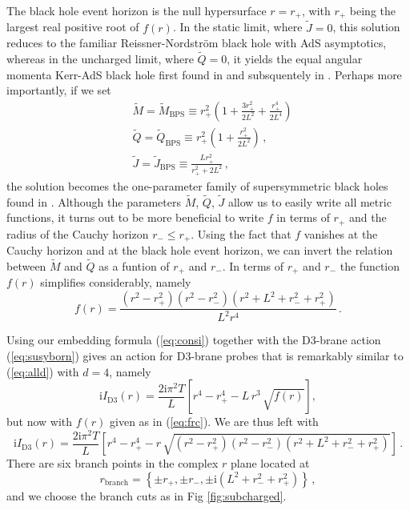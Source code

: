 \documentclass[11pt]{article}
\renewcommand{\i}{\mathrm{i}}
\begin{document}
The black hole event horizon is the null hypersurface $r=r_+$, with $r_+$ being the largest real positive root of $f(r)$. 
In the static limit, where $\tilde{J}=0$, this solution reduces to the familiar Reissner-Nordstr\"om black hole with AdS asymptotics, whereas in the uncharged limit, where $\tilde{Q}=0$, it yields the equal angular momenta Kerr-AdS black hole first found in \cite{Hawking:1998kw} and subsquentely in \cite{Gibbons:2004uw}. 
Perhaps more importantly, if we set
\begin{subequations}
\begin{align}
&\tilde{M}=\tilde{M}_{\mathrm{BPS}} \equiv r_+^2 \left(1+\frac{3 r_+^2}{2 L^2}+\frac{r_+^4}{2 L^4}\right)
\\
&\tilde{Q}=\tilde{Q}_{\mathrm{BPS}} \equiv r_+^2 \left(1+\frac{r_+^2}{2 L^2}\right)\,,
\\
&\tilde{J}=\tilde{J}_{\mathrm{BPS}}\equiv \frac{L r_+^2}{r_+^2+2 L^2}\, ,
\end{align}%
\end{subequations}
the solution becomes the one-parameter family of supersymmetric black holes found in \cite{Gutowski:2004yv,Gutowski:2004ez}.
Although the parameters $\tilde{M}$, $\tilde{Q}$, $\tilde{J}$ allow us to easily write all metric functions, it turns out to be more beneficial to write $f$ in terms of $r_+$ and the radius of the Cauchy horizon $r_-\leq r_+$. 
Using the fact that $f$ vanishes at the Cauchy horizon and at the black hole event horizon, we can invert the relation between $\tilde{M}$ and $\tilde{Q}$ as a funtion of $r_+$ and $r_-$. 
In terms of $r_+$ and $r_-$ the function $f(r)$ simplifies considerably, namely
\begin{equation}
f(r)=\frac{(r^2-r_+^2)(r^2-r_-^2)(r^2+L^2+r_-^2+r_+^2)}{L^2 r^4}\,.
\label{eq:frc}
\end{equation}

Using our embedding formula (\ref{eq:consi}) together with the D$3$-brane action (\ref{eq:susyborn}) gives an action for D$3$-brane probes that is remarkably similar to (\ref{eq:alld}) with $d=4$, namely
\begin{equation}
\i I_{\mathrm{D}3}(r)=\frac{2 \i \pi ^2 T}{L} \left[r^4-r_+^4-L\,r^3\, \sqrt{f(r)}\right],
\end{equation}
but now with $f(r)$ given as in (\ref{eq:frc}). We are thus left with
\begin{equation}
\i I_{\mathrm{D}3}(r)=\frac{2 \i \pi ^2 T}{L} \left[r^4-r_+^4-r\, \sqrt{(r^2-r_+^2)(r^2-r_-^2)(r^2+L^2+r_-^2+r_+^2)}\right]\,.
\label{eq:actionrot}
\end{equation}
There are six branch points in the complex $r$ plane located at
\begin{equation}
r_{\mathrm{branch}}=\left\{\pm r_+,\pm r_-,\pm\i(L^2+r_-^2+r_+^2)\right\}\,,
\end{equation}
and we choose the branch cuts as in Fig \ref{fig:subcharged}.
\end{document}
